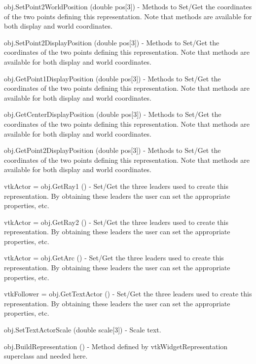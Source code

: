 \begin{DoxyItemize}
\item {\ttfamily obj.\-Set\-Point2\-World\-Position (double pos\mbox{[}3\mbox{]})} -\/ Methods to Set/\-Get the coordinates of the two points defining this representation. Note that methods are available for both display and world coordinates.  
\item {\ttfamily obj.\-Set\-Point2\-Display\-Position (double pos\mbox{[}3\mbox{]})} -\/ Methods to Set/\-Get the coordinates of the two points defining this representation. Note that methods are available for both display and world coordinates.  
\item {\ttfamily obj.\-Get\-Point1\-Display\-Position (double pos\mbox{[}3\mbox{]})} -\/ Methods to Set/\-Get the coordinates of the two points defining this representation. Note that methods are available for both display and world coordinates.  
\item {\ttfamily obj.\-Get\-Center\-Display\-Position (double pos\mbox{[}3\mbox{]})} -\/ Methods to Set/\-Get the coordinates of the two points defining this representation. Note that methods are available for both display and world coordinates.  
\item {\ttfamily obj.\-Get\-Point2\-Display\-Position (double pos\mbox{[}3\mbox{]})} -\/ Methods to Set/\-Get the coordinates of the two points defining this representation. Note that methods are available for both display and world coordinates.  
\item {\ttfamily vtk\-Actor = obj.\-Get\-Ray1 ()} -\/ Set/\-Get the three leaders used to create this representation. By obtaining these leaders the user can set the appropriate properties, etc.  
\item {\ttfamily vtk\-Actor = obj.\-Get\-Ray2 ()} -\/ Set/\-Get the three leaders used to create this representation. By obtaining these leaders the user can set the appropriate properties, etc.  
\item {\ttfamily vtk\-Actor = obj.\-Get\-Arc ()} -\/ Set/\-Get the three leaders used to create this representation. By obtaining these leaders the user can set the appropriate properties, etc.  
\item {\ttfamily vtk\-Follower = obj.\-Get\-Text\-Actor ()} -\/ Set/\-Get the three leaders used to create this representation. By obtaining these leaders the user can set the appropriate properties, etc.  
\item {\ttfamily obj.\-Set\-Text\-Actor\-Scale (double scale\mbox{[}3\mbox{]})} -\/ Scale text.  
\item {\ttfamily obj.\-Build\-Representation ()} -\/ Method defined by vtk\-Widget\-Representation superclass and needed here.  

\end{DoxyItemize}
